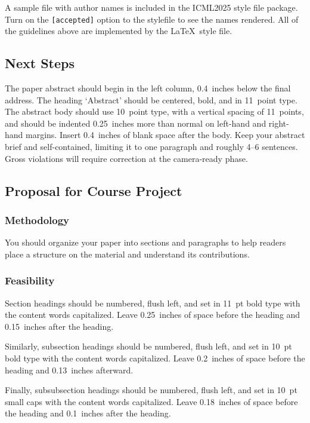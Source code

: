 \documentclass{article}
\theoremstyle{plain}
\theoremstyle{definition}
\theoremstyle{remark}
\begin{document}
A sample file with author names is included in the ICML2025 style file
package. Turn on the \texttt{[accepted]} option to the stylefile to
see the names rendered. All of the guidelines above are implemented
by the \LaTeX\ style file.

\subsection{Next Steps}

The paper abstract should begin in the left column, 0.4~inches below the final
address. The heading `Abstract' should be centered, bold, and in 11~point type.
The abstract body should use 10~point type, with a vertical spacing of
11~points, and should be indented 0.25~inches more than normal on left-hand and
right-hand margins. Insert 0.4~inches of blank space after the body. Keep your
abstract brief and self-contained, limiting it to one paragraph and roughly 4--6
sentences. Gross violations will require correction at the camera-ready phase.


\subsection{Proposal for Course Project}

\subsubsection{Methodology}

You should organize your paper into sections and paragraphs to help
readers place a structure on the material and understand its
contributions.

\subsubsection{Feasibility}

Section headings should be numbered, flush left, and set in 11~pt bold
type with the content words capitalized. Leave 0.25~inches of space
before the heading and 0.15~inches after the heading.

Similarly, subsection headings should be numbered, flush left, and set
in 10~pt bold type with the content words capitalized. Leave
0.2~inches of space before the heading and 0.13~inches afterward.

Finally, subsubsection headings should be numbered, flush left, and
set in 10~pt small caps with the content words capitalized. Leave
0.18~inches of space before the heading and 0.1~inches after the
heading.
\end{document}
